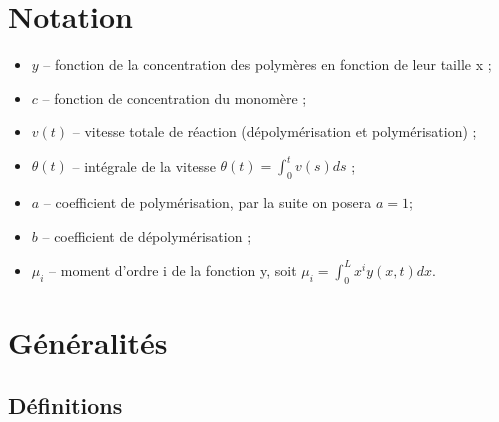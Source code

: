 \documentclass[a4paper]{article}
\newcommand{\pol}{a}
\newcommand{\dep}{b}
\begin{document}
\section{Notation}

\begin{itemize}
\item $y$ -- fonction de la concentration des polymères en fonction de leur taille x ;
\item $c$ -- fonction de concentration du monomère ;
\item $v(t)$ -- vitesse totale de réaction (dépolymérisation et polymérisation) ;
\item $\theta(t)$ -- intégrale de la vitesse $\theta(t)=\int_0^t v(s)ds$ ;
\item $\pol$ -- coefficient de polymérisation, par la suite on posera $\pol=1$;
\item $\dep$ -- coefficient de dépolymérisation ;
\item $\mu_i$ -- moment d'ordre i de la fonction y, soit $\mu_i = \int_0^L x^i y(x,t)dx$.
\end{itemize}




\section{Généralités}

\subsection{Définitions}
\end{document}
